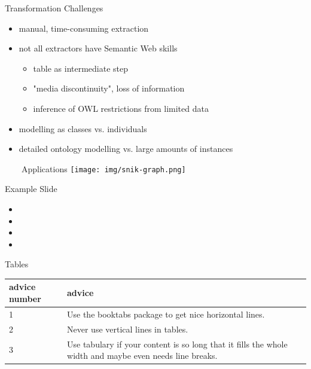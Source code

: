 \documentclass[aspectratio=1610,12pt]{beamer}
\newcommand{\imageslide}[4][]
{
\newgeometry{margin=0cm,top=1em}
\begin{frame}[plain]{~~~~#2}
\centering\texttt{[image: \#3]}
\\#1
\note{#4}
\end{frame}
\restoregeometry
}
\begin{document}
\begin{frame}{Transformation Challenges}
\begin{itemize}
\item manual, time-consuming extraction
\item not all extractors have Semantic Web skills 
\begin{itemize}
\item table as intermediate step
\item "media discontinuity", loss of information
\item inference of OWL restrictions from limited data 
\end{itemize}
\item modelling as classes vs. individuals
\item detailed ontology modelling vs. large amounts of instances 
\end{itemize}
\end{frame}




\begin{frame}[plain]{~~~~Applications}
\centering\texttt{[image: img/snik-graph.png]}
\end{frame}
\restoregeometry


\begin{frame}{Example Slide}
\begin{itemize}
\item 
\item 
\item 
\item 
\end{itemize}
\end{frame}

\iffalse 
\begin{frame}{Tables}
\begin{tabulary}{\textwidth}{lL}
\toprule
advice number    &advice\\
   &Use the booktabs package to get nice horizontal lines.\\
2   &Never use vertical lines in tables.\\
3   &Use tabulary if your content is so long that it fills the whole width and maybe even needs line breaks.\\
\bottomrule
\end{tabulary}
\end{frame}
\end{document}
